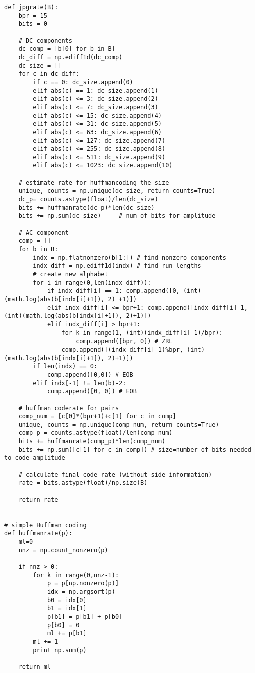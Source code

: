 \documentclass[10pt]{article}
\begin{document}
\begin{lstlisting}
def jpgrate(B):
	bpr = 15
	bits = 0
	
	# DC components 
	dc_comp = [b[0] for b in B]	
	dc_diff = np.ediff1d(dc_comp)
	dc_size = []
	for c in dc_diff:
		if c == 0: dc_size.append(0)
		elif abs(c) == 1: dc_size.append(1)
		elif abs(c) <= 3: dc_size.append(2)
		elif abs(c) <= 7: dc_size.append(3)
		elif abs(c) <= 15: dc_size.append(4)
		elif abs(c) <= 31: dc_size.append(5)
		elif abs(c) <= 63: dc_size.append(6)
		elif abs(c) <= 127: dc_size.append(7)
		elif abs(c) <= 255: dc_size.append(8)
		elif abs(c) <= 511: dc_size.append(9)
		elif abs(c) <= 1023: dc_size.append(10)
		
	# estimate rate for huffmancoding the size
	unique, counts = np.unique(dc_size, return_counts=True)
	dc_p= counts.astype(float)/len(dc_size)
	bits += huffmanrate(dc_p)*len(dc_size)
	bits += np.sum(dc_size)		# num of bits for amplitude
	
	# AC component
	comp = []	
	for b in B:
		indx = np.flatnonzero(b[1:]) # find nonzero components
		indx_diff = np.ediff1d(indx) # find run lengths
		# create new alphabet
		for i in range(0,len(indx_diff)):
			if indx_diff[i] == 1: comp.append([0, (int)(math.log(abs(b[indx[i]+1]), 2) +1)])
			elif indx_diff[i] <= bpr+1: comp.append([indx_diff[i]-1, (int)(math.log(abs(b[indx[i]+1]), 2)+1)])
			elif indx_diff[i] > bpr+1:
				for k in range(1, (int)(indx_diff[i]-1)/bpr):
					comp.append([bpr, 0]) # ZRL
				comp.append([(indx_diff[i]-1)%bpr, (int)(math.log(abs(b[indx[i]+1]), 2)+1)])
		if len(indx) == 0:
			comp.append([0,0]) # EOB
		elif indx[-1] != len(b)-2:
			comp.append([0, 0]) # EOB
		
	# huffman coderate for pairs
	comp_num = [c[0]*(bpr+1)+c[1] for c in comp]
	unique, counts = np.unique(comp_num, return_counts=True)
	comp_p = counts.astype(float)/len(comp_num)
	bits += huffmanrate(comp_p)*len(comp_num)
	bits += np.sum([c[1] for c in comp]) # size=number of bits needed to code amplitude
	
	# calculate final code rate (without side information)
	rate = bits.astype(float)/np.size(B)
	
	return rate


# simple Huffman coding
def huffmanrate(p):
	ml=0	
	nnz = np.count_nonzero(p)
	
	if nnz > 0:
		for k in range(0,nnz-1):
			p = p[np.nonzero(p)]
			idx = np.argsort(p)
			b0 = idx[0]	
			b1 = idx[1]
			p[b1] = p[b1] + p[b0]
			p[b0] = 0
			ml += p[b1]
		ml += 1	
		print np.sum(p)

	return ml
	
\end{lstlisting}
\end{document}
